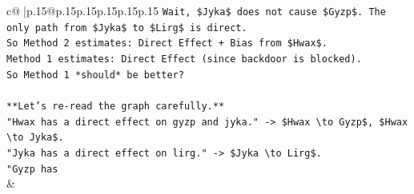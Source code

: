 \documentclass{article}
\begin{document}
{\begin{supertabular}{c@{$\;$}|p{.15\linewidth}@{}p{.15\linewidth}p{.15\linewidth}p{.15\linewidth}p{.15\linewidth}p{.15\linewidth}}
{{{\texttt{Wait, \$Jyka\$ does not cause \$Gyzp\$. The only path from \$Jyka\$ to \$Lirg\$ is direct.} \\
\texttt{So Method 2 estimates: Direct Effect + Bias from \$Hwax\$.} \\
\texttt{Method 1 estimates: Direct Effect (since backdoor is blocked).} \\
\texttt{So Method 1 *should* be better?} \\
\\ 
\texttt{**Let's re{-}read the graph carefully.**} \\
\texttt{"Hwax has a direct effect on gyzp and jyka." {-}> \$Hwax \textbackslash{}to Gyzp\$, \$Hwax \textbackslash{}to Jyka\$.} \\
\texttt{"Jyka has a direct effect on lirg." {-}> \$Jyka \textbackslash{}to Lirg\$.} \\
\texttt{"Gyzp has} \\
            }
        }
    }
    & \\ \\

\end{supertabular}
}
\end{document}
